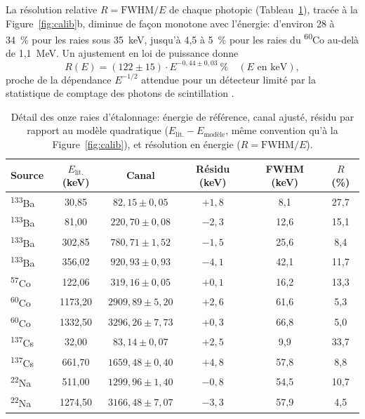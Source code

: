 \documentclass[11pt,letterpaper]{article}
\newcommand{\beq}[1]{\begin{equation} \label{#1}}
\def\enq{\end{equation}}
\begin{document}
La résolution relative $R = \text{FWHM}/E$ de chaque photopic (Tableau~\ref{tab:peaks}), tracée à la Figure~\ref{fig:calib}b, diminue de façon monotone avec l'énergie: d'environ 28 à 34~\% pour les raies sous 35~keV, jusqu'à 4,5 à 5~\% pour les raies du \textsuperscript{60}Co au-delà de 1,1~MeV. Un ajustement en loi de puissance donne
\beq{eq:resolution}
    R(E) = (122 \pm 15) \cdot E^{-0{,}44 \pm 0{,}03}~\% \quad (E \text{ en keV}) ,
\enq
proche de la dépendance $E^{-1/2}$ attendue pour un détecteur limité par la statistique de comptage des photons de scintillation \cite{knoll}.

\begin{table}[htbp]
\centering
\caption{Détail des onze raies d'étalonnage: énergie de référence, canal ajusté, résidu par rapport au modèle quadratique ($E_{\text{lit.}} - E_{\text{modèle}}$, même convention qu'à la Figure~\ref{fig:calib}), et résolution en énergie ($R = \text{FWHM}/E$).}
\label{tab:peaks}
\footnotesize
\renewcommand{\arraystretch}{0.85}
\begin{tabular}{lccccc}
\hline
Source & $E_{\text{lit.}}$ (keV) & Canal & Résidu (keV) & FWHM (keV) & $R$ (\%) \\
\hline
\textsuperscript{133}Ba & 30,85  & $82{,}15 \pm 0{,}05$   & $+1{,}8$ & 8,1  & 27,7 \\
\textsuperscript{133}Ba & 81,00  & $220{,}70 \pm 0{,}08$  & $-2{,}3$ & 12,6 & 15,1 \\
\textsuperscript{133}Ba & 302,85 & $780{,}71 \pm 1{,}52$  & $-1{,}5$ & 25,6 & 8,4  \\
\textsuperscript{133}Ba & 356,02 & $920{,}93 \pm 0{,}93$  & $-4{,}1$ & 42,1 & 11,7 \\
\textsuperscript{57}Co  & 122,06 & $319{,}16 \pm 0{,}05$  & $+0{,}1$ & 16,2 & 13,3 \\
\textsuperscript{60}Co  & 1173,20& $2909{,}89 \pm 5{,}20$ & $+2{,}6$ & 61,6 & 5,3  \\
\textsuperscript{60}Co  & 1332,50& $3296{,}26 \pm 7{,}73$ & $+0{,}3$ & 66,8 & 5,0  \\
\textsuperscript{137}Cs & 32,00  & $83{,}14 \pm 0{,}07$   & $+2{,}5$ & 9,9  & 33,7 \\
\textsuperscript{137}Cs & 661,70 & $1659{,}48 \pm 0{,}40$ & $+4{,}8$ & 57,8 & 8,8  \\
\textsuperscript{22}Na  & 511,00 & $1299{,}96 \pm 1{,}40$ & $-0{,}8$ & 54,5 & 10,7 \\
\textsuperscript{22}Na  & 1274,50& $3166{,}48 \pm 7{,}07$ & $-3{,}3$ & 57,9 & 4,5  \\
\hline
\end{tabular}
\renewcommand{\arraystretch}{1}
\end{table}
\end{document}
